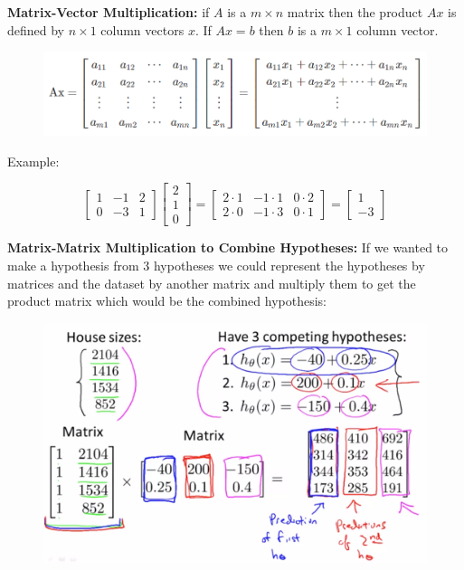 \noindent \textbf{Matrix-Vector Multiplication:} if $A$ is a $m\times n$ matrix then the product $Ax$
is defined by $n\times 1$ column vectors $x$. If $Ax=b$ then $b$ is a $m\times 1$ column vector.

\begin{figure}[hbt!]
    \centering
    \includegraphics[scale=0.75]{Resources/Matrix_Vector_Mult}
\end{figure}

\noindent Example:

\begin{equation*}
    \begin{bmatrix}
        1 & -1 & 2 \\
        0 & -3 & 1
    \end{bmatrix}
    \begin{bmatrix}
        2 \\
        1 \\
        0
    \end{bmatrix}
    =
    \begin{bmatrix}
        2\cdot 1    & -1\cdot 1 & 0\cdot 2 \\
        2\cdot 0    & -1\cdot 3 & 0\cdot 1
    \end{bmatrix}
    =
    \begin{bmatrix}
        1 \\
        -3
    \end{bmatrix}
\end{equation*}

\noindent \textbf{Matrix-Matrix Multiplication to Combine Hypotheses:} If we wanted to make a
hypothesis from 3 hypotheses we could represent the hypotheses by matrices and the dataset by another
matrix and multiply them to get the product matrix which would be the combined hypothesis:

\begin{figure}[hbt!]
    \centering
    \includegraphics[scale=0.4]{Resources/Hypothesis_Combination}
\end{figure}

